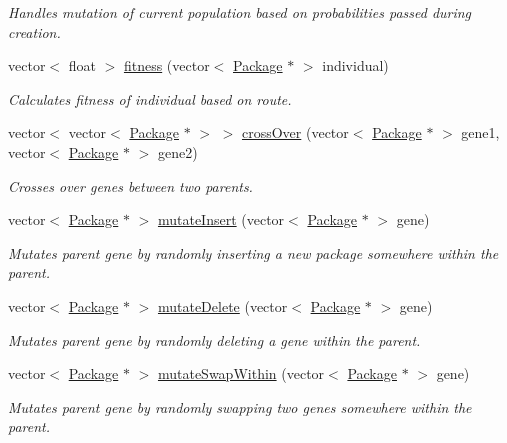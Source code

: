 \begin{DoxyCompactItemize}
\begin{DoxyCompactList}\small\item\em Handles mutation of current population based on probabilities passed during creation. \end{DoxyCompactList}\item 
vector$<$ float $>$ \hyperlink{classGenetic_a77e09f3e47c576867ce2e6ccac1b5085}{fitness} (vector$<$ \hyperlink{classPackage}{Package} $\ast$ $>$ individual)
\begin{DoxyCompactList}\small\item\em Calculates fitness of individual based on route. \end{DoxyCompactList}\item 
vector$<$ vector$<$ \hyperlink{classPackage}{Package} $\ast$ $>$ $>$ \hyperlink{classGenetic_a8ec0f431c16a6707205669aed60df55b}{cross\+Over} (vector$<$ \hyperlink{classPackage}{Package} $\ast$ $>$ gene1, vector$<$ \hyperlink{classPackage}{Package} $\ast$ $>$ gene2)
\begin{DoxyCompactList}\small\item\em Crosses over genes between two parents. \end{DoxyCompactList}\item 
vector$<$ \hyperlink{classPackage}{Package} $\ast$ $>$ \hyperlink{classGenetic_ac5342fa6161cfd70c931847adb8eee92}{mutate\+Insert} (vector$<$ \hyperlink{classPackage}{Package} $\ast$ $>$ gene)
\begin{DoxyCompactList}\small\item\em Mutates parent gene by randomly inserting a new package somewhere within the parent. \end{DoxyCompactList}\item 
vector$<$ \hyperlink{classPackage}{Package} $\ast$ $>$ \hyperlink{classGenetic_a99b8dc50662e232e163e5e8fd683a0f0}{mutate\+Delete} (vector$<$ \hyperlink{classPackage}{Package} $\ast$ $>$ gene)
\begin{DoxyCompactList}\small\item\em Mutates parent gene by randomly deleting a gene within the parent. \end{DoxyCompactList}\item 
vector$<$ \hyperlink{classPackage}{Package} $\ast$ $>$ \hyperlink{classGenetic_a3afe6bed9690b46bab884b935cc5b8d3}{mutate\+Swap\+Within} (vector$<$ \hyperlink{classPackage}{Package} $\ast$ $>$ gene)
\begin{DoxyCompactList}\small\item\em Mutates parent gene by randomly swapping two genes somewhere within the parent. \end{DoxyCompactList}\item 

\end{DoxyCompactItemize}
